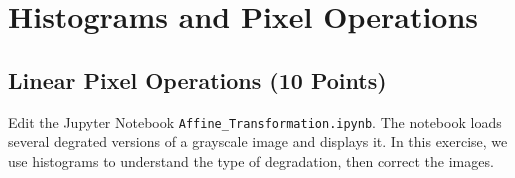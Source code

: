 \def\firstname{firstname}
\def\lastname{lastname}
\def\aufgabenblatt{2}




\thispagestyle{page1} 

\section{Histograms and Pixel Operations}

\subsection{Linear Pixel Operations (10 Points)}

Edit the Jupyter Notebook \texttt{Affine\_Transformation.ipynb}. The notebook loads several degrated versions of a grayscale image and displays it.
In this exercise, we use histograms to understand the type of degradation, then correct the images.

